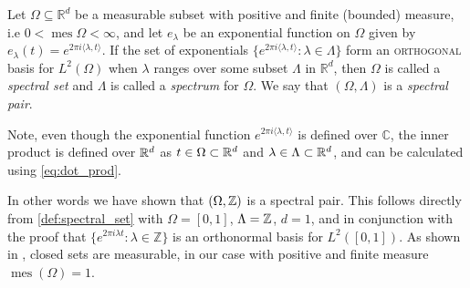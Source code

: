 \documentclass[../thesis.tex]{subfiles}
\begin{document}


\begin{definition} \label{def:spectral_set}
    Let $\Omega \subseteq \mathbb{R}^d$ be a measurable subset with positive and finite (bounded) measure, i.e $0< \operatorname{mes} \Omega < \infty$, and let $e_{\lambda}$ be an exponential function on $\Omega$ given by $e_{\lambda}(t) = e^{2\pi i \langle \lambda,t  \rangle }$. If the set of exponentials $\{ e^{2\pi i \langle \lambda,t  \rangle } : \lambda \in \Lambda\}$  form an \textsc{orthogonal} basis for $L^2 (\Omega)$ when $\lambda$ ranges over some subset $\Lambda$ in $\mathbb{R}^d$, then $\Omega$ is called a \emph{spectral set} and $\Lambda$ is called a \emph{spectrum} for $\Omega$. We say that $(\Omega, \Lambda)$ is a \emph{spectral pair}. 
\end{definition} 


Note, even though the exponential function $e^{2\pi i \langle \lambda,t  \rangle }$ is defined over $\mathbb{C}$, the inner product is defined over $\mathbb{R}^d$ as $t\in \Omega\subset \mathbb{R}^d$ and $\lambda \in \Lambda \subset \mathbb{R}^d$, and can be calculated using \cref{eq:dot_prod}.


In other words we have shown that $\left(\Omega,\mathbb{Z}\right)$ is a spectral pair. This follows directly from \cref{def:spectral_set} with $\Omega = [0,1]$, $\Lambda = \mathbb{Z} $, $d=1$, and in conjunction with the proof that $\{ e^{2\pi i \lambda t} : \lambda \in \mathbb{Z} \}$ is an orthonormal basis for $L^2([0,1])$. As shown in \cite{taoIntroductionMeasureTheory2011}, closed sets are measurable, in our case with positive and finite measure $\operatorname{mes}(\Omega) = 1$. %





\end{document}
